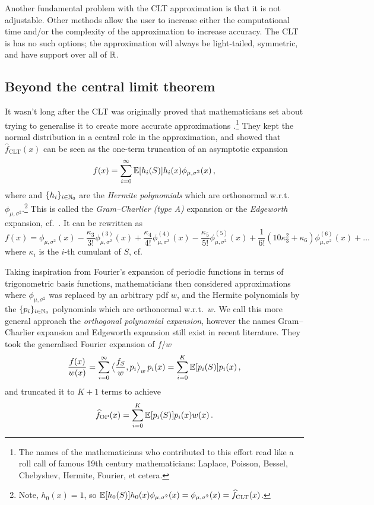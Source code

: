 Another fundamental problem with the CLT approximation is that it is not adjustable. Other methods allow the user to increase either the computational time and/or the complexity of the approximation to increase accuracy. The CLT is has no such options; the approximation will always be light-tailed, symmetric, and have support over all of $\mathbb{R}$.

\subsection{Beyond the central limit theorem}

It wasn't long after the CLT was originally proved that mathematicians set about trying to generalise it to create more accurate approximations \cite{hald2000early}.\footnote{The names of the mathematicians who contributed to this effort read like a roll call of famous 19th century mathematicians: Laplace, Poisson, Bessel, Chebyshev, Hermite, Fourier, et cetera.} They  kept the normal distribution in a central role in the approximation, and showed that $\hat{f}_{\mathrm{CLT}}(x)$ can be seen as the one-term truncation of an asymptotic expansion
\[ f(x) = \sum_{i=0}^\infty \operatorname{{\mathbb E}}[ h_i(S) ] h_i(x) \phi_{\mu,\sigma^2}(x) \,, \]
where and $\{ h_i \}_{i\in\mathbb{N}_0}$ are the \emph{Hermite polynomials} which are orthonormal w.r.t.\ $\phi_{\mu,\sigma^2}$.\footnote{Note, $h_0(x) = 1$, so $\operatorname{{\mathbb E}}[ h_0(S) ] h_0(x) \phi_{\mu,\sigma^2}(x) = \phi_{\mu,\sigma^2}(x) = \widehat{f}_{\mathrm{CLT}}(x)$.} This is called the \emph{Gram--Charlier (type A)} expansion or the \emph{Edgeworth} expansion, cf.\ \cite{barndorff1989asymptotic,kolassa2006series}. It can be rewritten as
\[ f(x) = \phi_{\mu,\sigma^2}(x) - \frac{\kappa_3}{3!} \phi_{\mu,\sigma^2}^{(3)}(x) + \frac{\kappa_4}{4!} \phi_{\mu,\sigma^2}^{(4)}(x) - \frac{\kappa_5}{5!} \phi_{\mu,\sigma^2}^{(5)}(x) + \frac{1}{6!}( 10 \kappa_3^2 + \kappa_6 ) \phi_{\mu,\sigma^2}^{(6)}(x) + \dots  \]
where $\kappa_i$ is the $i$-th cumulant of $S$, cf.\ \cite{berberan2007expressing,cohen2011generalization}

Taking inspiration from Fourier's expansion of periodic functions in terms of trigonometric basis functions, mathematicians then considered approximations where $\phi_{\mu,\sigma^2}$ was replaced by an arbitrary pdf $w$, and the Hermite polynomials by the $\{ p_i \}_{i\in\mathbb{N}_0}$ polynomials which are orthonormal w.r.t.\ $w$. We call this more general approach the \emph{orthogonal polynomial expansion}, however the names Gram--Charlier expansion and Edgeworth expansion still exist in recent literature. They took the generalised Fourier expansion of $f/w$
\[ \frac{f(x)}{w(x)} = \sum_{i=0}^\infty \big\langle \frac{f_S}{w}, p_i \big\rangle_w \, p_i(x) = \sum_{i=0}^K \operatorname{{\mathbb E}}[ p_i(S) ] p_i(x) \,, \]
and truncated it to $K+1$ terms to achieve
\[ \widehat{f}_{\mathrm{OP}}(x) = \sum_{i=0}^K \operatorname{{\mathbb E}}[ p_i(S) ] p_i(x) w(x) \,. \]

